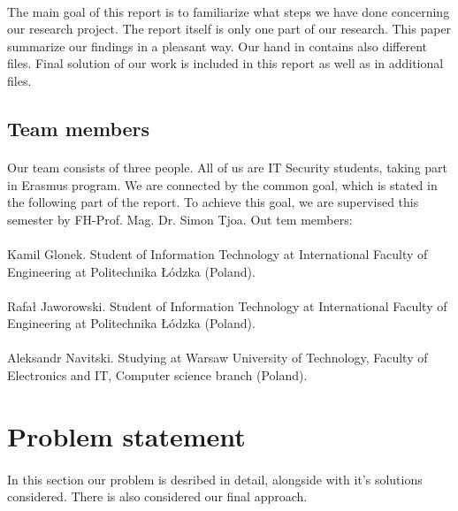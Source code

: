 \documentclass[12pt, a4paper]{article}
\begin{document}
\paragraph{}The main goal of this report is to familiarize what steps we have done concerning our research project. The report itself is only one part of our research. This paper summarize our findings in a pleasant way. Our hand in contains also different files. Final solution of our work is included in this report as well as in additional files.
\subsection{Team members}
\paragraph{} Our team consists of three people. All of us are IT Security students, taking part in Erasmus program. We are connected by the common goal, which is stated in the following part of the report. To achieve this goal, we are supervised this semester by FH-Prof. Mag. Dr. Simon Tjoa. Out tem members:

\paragraph{}
	\textbullet{} Kamil Glonek. Student of Information Technology at International Faculty of Engineering at Politechnika Łódzka (Poland). 
\paragraph{}
	\textbullet{} Rafał Jaworowski. Student of Information Technology at International Faculty of Engineering at Politechnika Łódzka (Poland). 
\paragraph{}
	\textbullet{} Aleksandr Navitski. Studying at Warsaw University of Technology, Faculty of Electronics and IT, Computer science branch (Poland).

\section{Problem statement}
\paragraph{} In this section our problem is desribed in detail, alongside with it's solutions considered. There is also considered our final approach.
\end{document}
